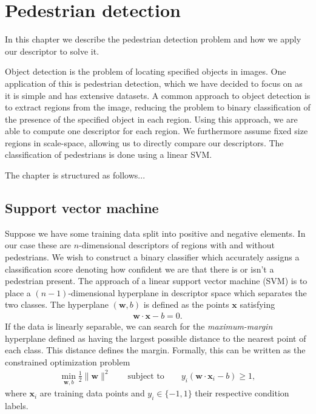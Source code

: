 \documentclass[thesis.tex]{subfiles}
\def\x{\mathbf{x}}
\def\w{\mathbf{w}}
\begin{document}
\chapter{Pedestrian detection}
\label{sec:od}
In this chapter we describe the pedestrian detection problem and how we apply our descriptor to solve it.

Object detection is the problem of locating specified objects in images. One application of this is pedestrian detection, which we have decided to focus on as it is simple and has extensive datasets. A common approach to object detection is to extract regions from the image, reducing the problem to binary classification of the presence of the specified object in each region. Using this approach, we are able to compute one descriptor for each region. We furthermore assume fixed size regions in scale-space, allowing us to directly compare our descriptors. The classification of pedestrians is done using a linear SVM.

The chapter is structured as follows...

\section{Support vector machine}

Suppose we have some training data split into positive and negative elements. In our case these are $n$-dimensional descriptors of regions with and without pedestrians. We wish to construct a binary classifier which accurately assigns a classification score denoting how confident we are that there is or isn't a pedestrian present. The approach of a linear support vector machine (SVM) is to place a $(n-1)$-dimensional hyperplane in descriptor space which separates the two classes. The hyperplane $(\w,b)$ is defined as the points $\x$ satisfying
%
\begin{align*}
\w \cdot \x - b = 0.
\end{align*}
%
If the data is linearly separable, we can search for the \emph{maximum-margin} hyperplane defined as having the largest possible distance to the nearest point of each class. This distance defines the margin. Formally, this can be written as the constrained optimization problem
%
\begin{align*}
\min_{\w,b} \frac12 \| \w \|^2 \qquad \text{subject to} \qquad y_i (\w \cdot \x_i - b) \geq 1,
\end{align*}
%
where $\x_i$ are training data points and $y_i \in \{-1,1\}$ their respective condition labels.
\end{document}
